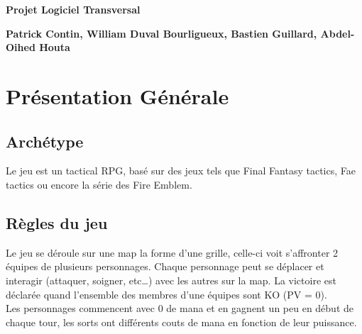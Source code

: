 \documentclass[a4paper,12pt]{article}
\begin{document}
\thispagestyle{empty}

\begin{titlepage}

\vspace*{2cm}

\begin{center}\textbf{\Huge Projet Logiciel Transversal}\end{center}{\Large \par}

\begin{center}\textbf{\large Patrick Contin, William Duval Bourligueux, Bastien Guillard, Abdel-Oihed Houta}\end{center}{\large \par}

\vspace{2cm}


\clearpage

{\small
\tableofcontents
}

\end{titlepage}

\clearpage
\section{Présentation Générale}

\subsection{Archétype}

Le jeu est un tactical RPG, basé sur des jeux tels que Final Fantasy
tactics, Fae tactics ou encore la série des Fire Emblem.

\subsection{Règles du jeu}

Le jeu se déroule sur une map la forme d'une grille, celle-ci voit 
s'affronter 2 équipes de plusieurs personnages. Chaque personnage peut se 
déplacer et interagir (attaquer, soigner, etc\dots) avec les autres sur la map.
La victoire est déclarée quand l'ensemble des membres d'une équipes 
sont KO (PV = 0). \\
Les personnages commencent avec 0 de mana et en gagnent un peu en début de chaque tour, les sorts ont différents couts de mana en fonction de leur puissance.
\end{document}

